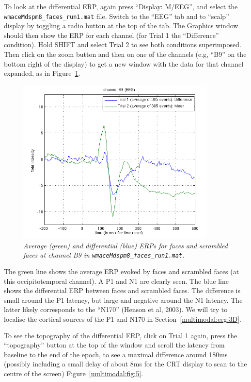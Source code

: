 To look at the differential ERP, again press ``Display: M/EEG'', and select the \texttt{wmaceMdspm8\_faces\_run1.mat} file. Switch to the ``EEG'' tab and to ``scalp'' display by toggling a radio button at the top of the tab. The Graphics window should then show the ERP for each channel (for Trial 1 the ``Difference'' condition). Hold SHIFT and select Trial 2 to see both conditions superimposed. Then click on the zoom button and then on one of the channels (e.g, ``B9'' on the bottom right of the display) to get a new window with the data for that channel expanded, as in Figure~\ref{multimodal:fig:4}.

\begin{figure}
\begin{center}
\includegraphics[width=100mm]{multimodal/figures/eeg_erp}
\caption{\em  Average (green) and differential (blue) ERPs for faces and scrambled faces at channel B9 in \texttt{wmaceMdspm8\_faces\_run1.mat}. \label{multimodal:fig:4}}
\end{center}
\end{figure}

The green line shows the average ERP evoked by faces and scrambled faces (at this occipitotemporal channel). A P1 and N1 are clearly seen. The blue line shows the differential ERP between faces and scrambled faces. The difference is small around the P1 latency, but large and negative around the N1 latency. The latter likely corresponds to the ``N170'' (Henson et al, 2003). We will try to localise the cortical sources of the P1 and N170 in Section~\ref{multimodal:eeg:3D}.

To see the topography of the differential ERP, click on Trial 1 again, press the ``topography'' button at the top of the window and scroll the latency from baseline to the end of the epoch, to see a maximal difference around 180ms (possibly including a small delay of about 8ms for the CRT display to scan to the centre of the screen) Figure~\ref{multimodal:fig:5}.

